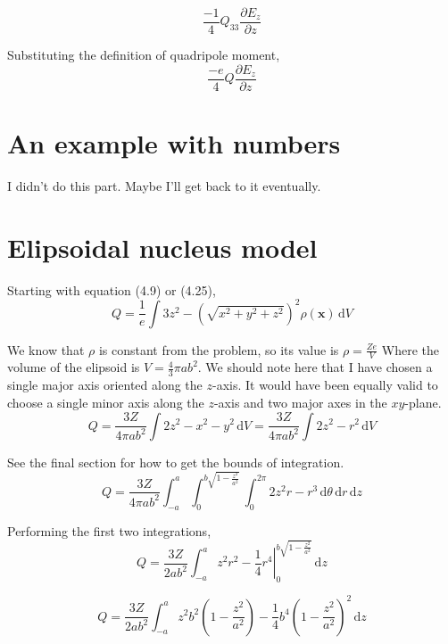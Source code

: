 \documentclass[10pt,a4paper]{article}
\begin{document}
\begin{equation}
\frac{-1}{4}Q_{33}\frac{\partial E_z}{\partial z}
\end{equation}

Substituting the definition of quadripole moment,
\begin{equation}
\frac{-e}{4}Q\frac{\partial E_z}{\partial z}
\end{equation}

\section{An example with numbers}
I didn't do this part.  Maybe I'll get back to it eventually.

\section{Elipsoidal nucleus model}
Starting with equation (4.9) or (4.25),
\begin{equation}
Q=\frac{1}{e}\int 3z^2-\left(\sqrt{x^2+y^2+z^2}\right)^2 \rho(\mathbf{x})\, \mathrm{d}V
\end{equation}

We know that $\rho$ is constant from the problem, so its value is $\rho=\frac{Ze}{V}$  Where the volume of the elipsoid is $V=\frac{4}{3}\pi ab^2$.  We should note here that I have chosen a single major axis oriented along the $z$-axis.  It would have been equally valid to choose a single minor axis along the $z$-axis and two major axes in the $xy$-plane.
\begin{equation}
Q=\frac{3Z}{4\pi ab^2}\int 2z^2-x^2-y^2 \, \mathrm{d}V
=\frac{3Z}{4\pi ab^2}\int 2z^2-r^2 \, \mathrm{d}V
\end{equation}

See the final section for how to get the bounds of integration.
\begin{equation}
Q=\frac{3Z}{4\pi ab^2} \int_{-a}^a\int_0^{b\sqrt{1-\frac{z^2}{a^2}}}\int_0^{2\pi}
2z^2r-r^3 \, \mathrm{d}\theta \, \mathrm{d}r \, \mathrm{d}z
\end{equation}

Performing the first two integrations,
\begin{equation}
Q=\frac{3Z}{2 ab^2} \int_{-a}^a
\left. z^2r^2-\frac{1}{4}r^4 \right|_0^{b\sqrt{1-\frac{z^2}{a^2}}} \,\mathrm{d}z
\end{equation}

\begin{equation}
Q=\frac{3Z}{2 ab^2} \int_{-a}^a z^2b^2 \left(1-\frac{z^2}{a^2}\right)-\frac{1}{4}b^4\left(1-\frac{z^2}{a^2}\right)^2 \,\mathrm{d}z
\end{equation}
\end{document}
